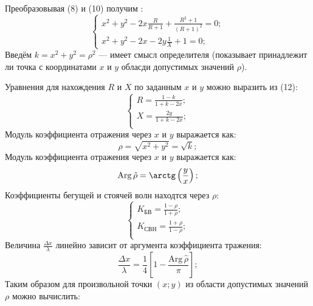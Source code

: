 \documentclass[12pt,a4paper]{article}
\begin{document}
\begin{minipage}{0.5\textwidth}
		Преобразовывая (8) и (10) получим :
		\begin{equation}
			\begin{cases}
				x^2 + y^2 - 2x\displaystyle\frac{R}{R+1} + \frac{R^2+1}{{(R+1)}^2} = 0; \\
				x^2 + y^2 - 2x - 2y\displaystyle\frac1X + 1 = 0;
			\end{cases}
		\end{equation}
		Введём $k = x^2 + y^2 = {\rho}^2$ \quad --- \quad имеет смысл определителя (показывает принадлежит
		ли точка с координатами $x$ и $y$ обласди допустимых значений $\rho$).
	\end{minipage}
	\newpage
	\thispagestyle{empty}
	\begin{minipage}{0.5\textwidth}
		Уравнения для нахождения $R$ и $X$ по заданным $x$ и $y$ можно выразить из (12):
		\begin{equation}
			\begin{cases}
				R = \displaystyle \frac{1-k}{1+k-2x}; \\
				X = \displaystyle \frac{2y}{1+k-2x}; \\
			\end{cases}
		\end{equation}
		Модуль коэффициента отражения через $x$ и $y$ выражается как:
		\begin{equation}
			\rho = \sqrt{x^2 + y^2} = \sqrt{k};
		\end{equation}
		Модуль коэффициента отражения через $x$ и $y$ выражается как:
		\begin{equation}
			\mathrm{Arg}\,\hat{\rho} = \arctg \left( \displaystyle\frac{y}{x} \right);
		\end{equation}
		Коэффициенты бегущей и стоячей волн находтся через $\rho$:
		\begin{equation}
			\begin{cases}
				K_{\text{БВ}}  = \displaystyle \frac{1-\rho}{1+\rho}; \\
				K_{\text{СВН}} = \displaystyle \frac{1+\rho}{1-\rho}; \\
			\end{cases}
		\end{equation}
		Величина $\displaystyle \frac{\Delta x}{\lambda}$ линейно зависит от аргумента коэффициента тражения:
		\begin{equation}
			\displaystyle \frac{\Delta x}{\lambda} =
			\frac14 \left[ 1 - \frac{\mathrm{Arg}\,\hat{\rho}}{\pi} \right];
		\end{equation}
		Таким образом для произвольной точки $(x;y)$ из области допустимых значений $\rho$ можно вычислить:

\end{minipage}
\end{document}
